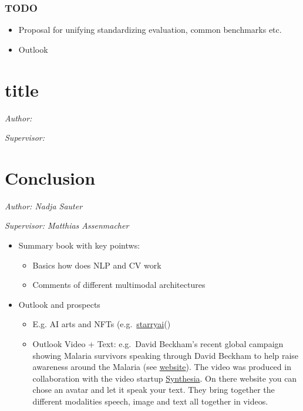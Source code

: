 \documentclass[
]{krantz}
\providecommand{\tightlist}{%
  \setlength{\itemsep}{0pt}\setlength{\parskip}{0pt}}
\begin{document}
\hypertarget{todo-4}{%
\subsection{TODO}\label{todo-4}}

\begin{itemize}
\tightlist
\item
  Proposal for unifying standardizing evaluation, common benchmarks etc.
\item
  Outlook
\end{itemize}

\hypertarget{title}{%
\chapter{title}\label{title}}

\emph{Author: }

\emph{Supervisor: }

\hypertarget{conclusion}{%
\chapter{Conclusion}\label{conclusion}}

\emph{Author: Nadja Sauter}

\emph{Supervisor: Matthias Assenmacher}

\begin{itemize}
\tightlist
\item
  Summary book with key pointws:

  \begin{itemize}
  \tightlist
  \item
    Basics how does NLP and CV work
  \item
    Comments of different multimodal architectures
  \end{itemize}
\item
  Outlook and prospects

  \begin{itemize}
  \tightlist
  \item
    E.g. AI arts and NFTs (e.g.~\href{e.g.\%20https://www.starryai.com/create-nft-art-with-artificial-intelligence}{starryai}()
  \item
    Outlook Video + Text: e.g.~David Beckham's recent global campaign showing Malaria survivors speaking through David Beckham to help raise awareness around the Malaria (see \href{https://techcrunch.com/2019/04/25/the-startup-behind-that-deep-fake-david-beckham-video-just-raised-3m/}{website}). The video was produced in collaboration with the video startup \href{https://www.synthesia.io/}{Synthesia}. On there website you can chose an avatar and let it speak your text. They bring together the different modalities speech, image and text all together in videos.
  \end{itemize}
\end{itemize}
\end{document}
